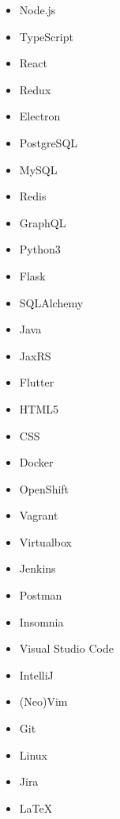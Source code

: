 

\begin{multicols}{5}
	\begin{itemize}
		\item Node.js
		\item TypeScript
		\item React
		\item Redux
		\item Electron
		\item PostgreSQL
		\item MySQL
		\item Redis
		\item GraphQL
		\item Python3
		\item Flask
		\item SQLAlchemy
		\item Java
		\item JaxRS
		\item Flutter
		\item HTML5
		\item CSS
		\item Docker
		\item OpenShift
		\item Vagrant
		\item Virtualbox
		\item Jenkins
		\item Postman
		\item Insomnia
		\item Visual Studio Code
		\item IntelliJ
		\item (Neo)Vim
		\item Git
		\item Linux
		\item Jira
		\item LaTeX
	\end{itemize}
\end{multicols}
